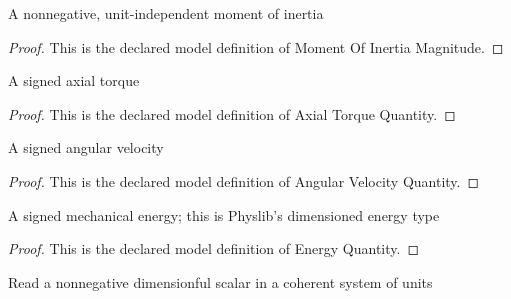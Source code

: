 \begin{definition}
  \label{def:physics:phyx-mini-0954:phyxminiproblems-problemphyxmini0954-momentofinertiamagnitude}
  A nonnegative, unit-independent moment of inertia
\end{definition}
\begin{proof}
  This is the declared model definition of Moment Of Inertia Magnitude.
\end{proof}
\begin{definition}
  \label{def:physics:phyx-mini-0954:phyxminiproblems-problemphyxmini0954-axialtorquequantity}
  A signed axial torque
\end{definition}
\begin{proof}
  This is the declared model definition of Axial Torque Quantity.
\end{proof}
\begin{definition}
  \label{def:physics:phyx-mini-0954:phyxminiproblems-problemphyxmini0954-angularvelocityquantity}
  A signed angular velocity
\end{definition}
\begin{proof}
  This is the declared model definition of Angular Velocity Quantity.
\end{proof}
\begin{definition}
  \label{def:physics:phyx-mini-0954:phyxminiproblems-problemphyxmini0954-energyquantity}
  A signed mechanical energy; this is Physlib's dimensioned energy type
\end{definition}
\begin{proof}
  This is the declared model definition of Energy Quantity.
\end{proof}
\begin{definition}
  \label{def:physics:phyx-mini-0954:phyxminiproblems-problemphyxmini0954-nonnegativereadout}
  Read a nonnegative dimensionful scalar in a coherent system of units
\end{definition}
